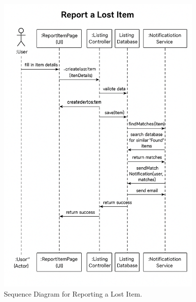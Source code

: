 \documentclass[11pt, a4paper]{article}
\begin{document}
\begin{figure}[h!]
    \centering
    \includegraphics[width=0.9\textwidth]{sequence-report-item.png}
    \caption{Sequence Diagram for Reporting a Lost Item.}
    \label{fig:sequencereport}
\end{figure}
\newpage
\end{document}
